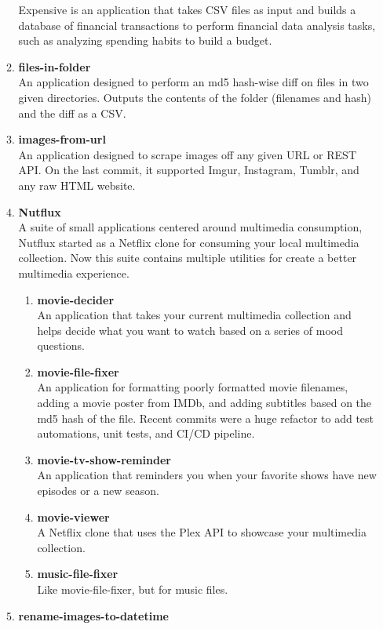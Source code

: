 \documentclass[oneside]{article}%
\begin{document}
\begin{enumerate}[]
\begin{enumerate}[]
				Expensive\textsuperscript{\textcopyright} is an application that takes CSV files as input and builds a database of financial transactions to perform financial data analysis tasks, such as analyzing spending habits to build a budget.
			\item \textbf{files-in-folder}\\
				An application designed to perform an md5 hash-wise diff on files in two given directories. Outputs the contents of the folder (filenames and hash) and the diff as a CSV.
			\item \textbf{images-from-url}\\
				An application designed to scrape images off any given URL or REST API. On the last commit, it supported Imgur, Instagram, Tumblr, and any raw HTML website.
			\item \textbf{Nutflux}\\
				A suite of small applications centered around multimedia consumption, Nutflux\textsuperscript{\textcopyright} started as a Netflix clone for consuming your local multimedia collection. Now this suite contains multiple utilities for create a better multimedia experience.
				\begin{enumerate}[]
					\item \textbf{movie-decider}\\
						An application that takes your current multimedia collection and helps decide what you want to watch based on a series of mood questions.
					\item \textbf{movie-file-fixer}\\
						An application for formatting poorly formatted movie filenames, adding a movie poster from IMDb, and adding subtitles based on the md5 hash of the file. Recent commits were a huge refactor to add test automations, unit tests, and CI/CD pipeline.
					\item \textbf{movie-tv-show-reminder}\\
						An application that reminders you when your favorite shows have new episodes or a new season.
					\item \textbf{movie-viewer}\\
						A Netflix clone that uses the Plex API to showcase your multimedia collection.
					\item \textbf{music-file-fixer}\\
						Like movie-file-fixer, but for music files.
				\end{enumerate}
			\item \textbf{rename-images-to-datetime}\\

\end{enumerate}
\end{enumerate}
\end{document}
